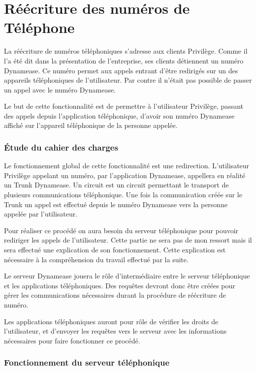 \section{Réécriture des numéros de Téléphone}

La réécriture de numéros téléphoniques s'adresse aux clients Privilège. Comme il l'a été dit dans la présentation de l'entreprise, ses clients détiennent un numéro Dynamease. Ce numéro permet aux appels entrant d'être redirigés sur un des appareils téléphoniques de l'utilisateur. Par contre il n'était pas possible de passer un appel avec le numéro Dynamease.

Le but de cette fonctionnalité est de permettre à l'utilisateur Privilège, passant des appels depuis l'application téléphonique, d'avoir son numéro Dynamease affiché sur l'appareil téléphonique de la personne appelée.

\subsubsection{Étude du cahier des charges}

Le fonctionnement global de cette fonctionnalité est une redirection. L'utilisateur Privilège appelant un numéro, par l'application Dynamease, appellera en réalité un Trunk Dynamease. Un circuit est un circuit permettant le transport de plusieurs communications téléphonique. Une fois la communication créée sur le Trunk un appel est effectué depuis le numéro Dynamease vers la personne appelée par l'utilisateur.

Pour réaliser ce procédé on aura besoin du serveur téléphonique pour pouvoir rediriger les appels de l'utilisateur. Cette partie ne sera pas de mon ressort mais il sera effectué une explication de son fonctionnement. Cette explication est nécessaire à la compréhension du travail effectué par la suite.

Le serveur Dynamease jouera le rôle d'intermédiaire entre le serveur téléphonique et les applications téléphoniques. Des requêtes devront donc être créées pour gérer les communications nécessaires durant la procédure de réécriture de numéro.

Les applications téléphoniques auront pour rôle de vérifier les droits de l'utilisateur, et d'envoyer les requêtes vers le serveur avec les informations nécessaires pour faire fonctionner ce procédé.

\subsubsection{Fonctionnement du serveur téléphonique}


